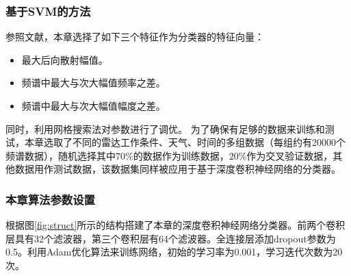 \subsubsection{基于SVM的方法}
参照文献\cite{jin2012svm}，本章选择了如下三个特征作为分类器的特征向量：
\begin{itemize}
	\item 最大后向散射幅值。
	\item 频谱中最大与次大幅值频率之差。
	\item 频谱中最大与次大幅值幅度之差。
\end{itemize}
同时，利用网格搜索法对参数进行了调优。
为了确保有足够的数据来训练和测试，本章选取了不同的雷达工作条件、天气、时间的多组数据（每组约有20000个频谱数据），随机选择其中$70\%$的数据作为训练数据，$20\%$作为交叉验证数据，其他数据用作测试数据，该数据集同样被应用于基于深度卷积神经网络的分类器。

\subsubsection{本章算法参数设置}
根据图\ref{fig:struct}所示的结构搭建了本章的深度卷积神经网络分类器。前两个卷积层具有32个滤波器，第三个卷积层有64个滤波器。全连接层添加dropout参数为0.5。利用Adam优化算法来训练网络，初始的学习率为0.001，学习迭代次数为20次。

